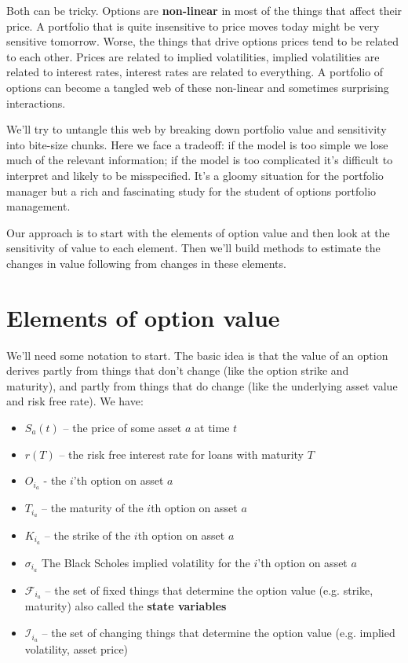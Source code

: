 Both can be tricky. Options are \textbf{non-linear} in most of the things that affect their price. A portfolio that is quite insensitive to price moves today might be very sensitive tomorrow. Worse, the things that drive options prices tend to be related to each other. Prices are related to implied volatilities, implied volatilities are related to interest rates, interest rates are related to everything. A portfolio of options can become a tangled web of these non-linear and sometimes surprising interactions. 

We'll try to untangle this web by breaking down portfolio value and sensitivity into bite-size chunks. Here we face a tradeoff: if the model is too simple we lose much of the relevant information; if the model is  too complicated it's difficult to interpret and likely to be misspecified. It's a gloomy situation for the portfolio manager but a rich and fascinating study for the student of options portfolio management.

Our approach is to start with the elements of option value and then look at the sensitivity of value to each element. Then we'll build methods to estimate the changes in value following from changes in these elements.


\section{Elements of option value}

We'll need some notation to start. The basic idea is that the value of an option derives partly from things that don't change (like the option strike and maturity), and partly from things that do change (like the underlying asset value and risk free rate). We have:

\begin{itemize}
\item $S_a(t)$ -- the price of some asset $a$ at time $t$\\
\item $r(T)$ -- the risk free interest rate for loans with maturity $T$\\
\item $O_{i_a}$ - the $i$'th option on asset $a$\\
\item $T_{i_a}$ -- the maturity of the $i$th option on asset $a$\\
\item $K_{i_a}$ -- the strike of the $i$th option on asset $a$\\
\item $\sigma_{i_a}$ The Black Scholes implied volatility for the $i$'th option on asset $a$\\
\item $\mathcal{F}_{i_a}$ -- the set of fixed things that determine the option value (e.g. strike, maturity) also called the \textbf{state variables}\\
\item $\mathcal{I}_{i_a}$ -- the set of changing things that determine the option value (e.g. implied volatility, asset price)\\
\end{itemize}

